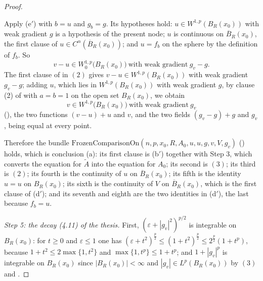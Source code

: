 \begin{proof}
\begin{enumerate}
\end{enumerate}
Apply (e$'$) with $b=u$ and $g_b=g$.  Its hypotheses hold:
$u\in W^{1,p}(B_R(x_0))$ with weak gradient $g$ is a hypothesis of the present
node; $u$ is continuous on $\overline B_R(x_0)$, the first clause of
$u\in C^\alpha(\overline B_R(x_0))$; and $u=f_b$ on the sphere by the
definition of $f_b$.  So
\[
v-u\in W^{1,p}_0\bigl(B_R(x_0)\bigr)\ \text{with weak gradient}\ g_v-g .
\tag{2}
\]
The first clause of  in $(2)$ gives
$v-u\in W^{1,p}(B_R(x_0))$ with weak gradient $g_v-g$; adding $u$, which lies
in $W^{1,p}(B_R(x_0))$ with weak gradient $g$, by clause (2) of
 with $a=b=1$ on the open set $B_R(x_0)$, we obtain
\[
v\in W^{1,p}\bigl(B_R(x_0)\bigr)\ \text{with weak gradient}\ g_v
\tag{3}
\]
(), the two functions $(v-u)+u$ and $v$, and the two fields
$(g_v-g)+g$ and $g_v$, being equal at every point.

Therefore the bundle
$\mathrm{FrozenComparisonOn}(n,p,x_0,R,A_0,u,u,g,v,V,g_v)$
() holds, which is conclusion (a): its first clause
is (b$'$) together with Step 3, which converts the equation for $\widetilde A$
into the equation for $A_0$; its second is $(3)$; its third is $(2)$; its
fourth is the continuity of $u$ on $\overline B_R(x_0)$; its fifth is the
identity $u=u$ on $B_R(x_0)$; its sixth is the continuity of $V$ on
$\overline B_R(x_0)$, which is the first clause of (d$'$); and its seventh and
eighth are the two identities in (d$'$), the last because $f_b=u$.

\emph{Step 5: the decay (4.11) of the thesis.}  First,
$(\varepsilon+|g_v|^2)^{p/2}$ is integrable on $B_R(x_0)$: for $t\ge0$ and
$\varepsilon\le1$ one has
$(\varepsilon+t^2)^{\frac p2}\le(1+t^2)^{\frac p2}\le2^{\frac p2}(1+t^p)$,
because $1+t^2\le2\max\{1,t^2\}$ and $\max\{1,t^p\}\le1+t^p$; and
$1+|g_v|^p$ is integrable on $B_R(x_0)$ since $|B_R(x_0)|<\infty$ and
$|g_v|\in L^p(B_R(x_0))$ by $(3)$ and .


\end{proof}
